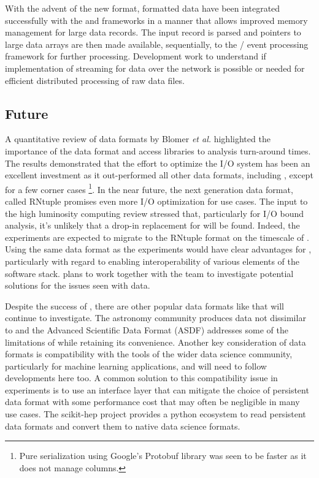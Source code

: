 \documentclass[../main-v1.tex]{subfiles}
\begin{document}
With the advent of the new  format,  formatted data have been integrated successfully with the  and  frameworks in a manner that allows improved memory management for large data records.  The  input  record is parsed and pointers to large data arrays are then made available, sequentially, to the / event processing framework for further processing. Development work to understand if implementation of streaming for  data over the network is possible or needed for efficient distributed processing of raw data files.


\subsection{Future }
A quantitative review of data formats by Blomer {\it et al.}\cite{Blomer:2018icl} 
highlighted the importance of the data format and access libraries to analysis turn-around times.  The results demonstrated that the effort to optimize the  I/O system has been an excellent investment as it out-performed all other data formats, including , except for a few corner cases
\footnote{Pure serialization using Google's Protobuf library was seen to be faster as it does not manage columns.}.
In the near future, the next generation  data format, called RNtuple 
\cite{Blomer:2020usr, ROOTTeam:2020jal} promises even more I/O optimization for  use cases.  The  input to the high luminosity  computing review \cite{HEPSoftwareFoundation:2020daq} stressed that, particularly for I/O bound analysis, it's unlikely that a drop-in replacement for  will be found.
Indeed, the  experiments are expected to migrate to the RNtuple format on the timescale of .  Using the same data format as the  experiments would have clear advantages for , particularly with regard to enabling interoperability of various elements of the software stack.  plans to work together with the  team to investigate potential solutions for the issues seen with  data.

Despite the success of , there are other popular data formats like  that  will continue to investigate.  The astronomy community produces data not dissimilar to  and the Advanced Scientific Data Format (ASDF) addresses some of the limitations of  while retaining its convenience. Another key consideration of data formats is compatibility with the tools of the wider data science community, particularly for machine learning applications, and  will need to follow developments here too.  A common solution to this compatibility issue in  experiments is to use an interface layer that can mitigate the choice of persistent data format with some performance cost that may often be negligible in many use cases.  The scikit-hep project\cite{Rodrigues:2019nct} provides a python ecosystem to read  persistent data formats and convert them to native data science formats.
\end{document}
